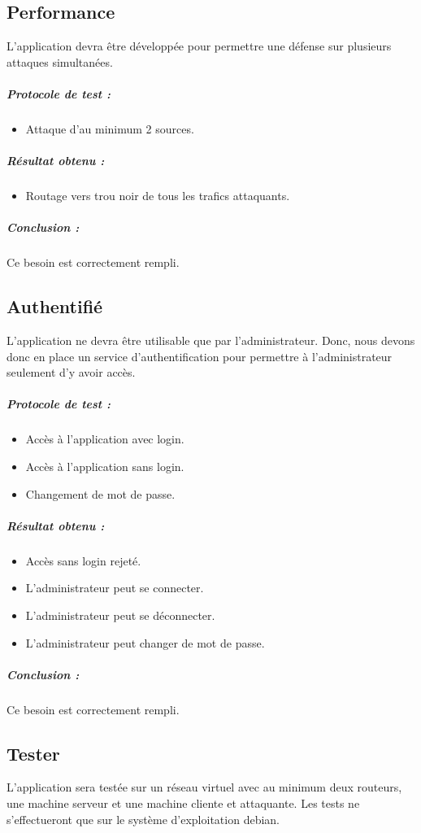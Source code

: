 \subsection{Performance}
L'application devra être développée pour permettre une défense sur plusieurs attaques simultanées. %

\subparagraph{Protocole de test :}
\begin{itemize}
    \item Attaque d'au minimum 2 sources.
\end{itemize}
\subparagraph{Résultat obtenu :}
    \begin{itemize}
    \item Routage vers trou noir de tous les trafics attaquants.
\end{itemize}
\subparagraph{Conclusion :}Ce besoin est correctement rempli.

\subsection{Authentifié}
L’application ne devra être utilisable que par l'administrateur. Donc, nous devons donc en place un service d'authentification pour permettre à l'administrateur seulement d'y avoir accès.

\subparagraph{Protocole de test :}
\begin{itemize}
    \item Accès à l'application avec login.
    \item Accès à l'application sans login.
    \item Changement de mot de passe.
\end{itemize}
\subparagraph{Résultat obtenu :}
    \begin{itemize}
    \item Accès sans login rejeté.
    \item L'administrateur peut se connecter.
    \item L'administrateur peut se déconnecter.
    \item L'administrateur peut changer de mot de passe.
\end{itemize}
\subparagraph{Conclusion :}Ce besoin est correctement rempli.

\subsection{Tester}
L'application sera testée sur un réseau virtuel avec au minimum deux routeurs, une machine serveur et une machine cliente et attaquante. Les tests ne s'effectueront que sur le système d'exploitation debian.

